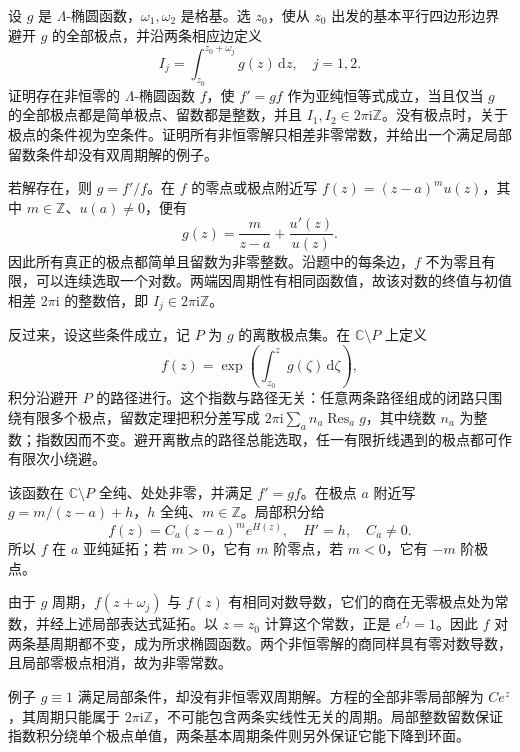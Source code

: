\begin{exercise}[一阶方程的双周期解]\label{b3:ex:22-6}
设 \(g\) 是 \(\Lambda\)-椭圆函数，\(\omega_1,\omega_2\) 是格基。选 \(z_0\)，使从 \(z_0\) 出发的基本平行四边形边界避开 \(g\) 的全部极点，并沿两条相应边定义
\[
 I_j=\int_{z_0}^{z_0+\omega_j}g(z)\,\mathrm{d}z,\quad j=1,2.
\]
证明存在非恒零的 \(\Lambda\)-椭圆函数 \(f\)，使 \(f'=gf\) 作为亚纯恒等式成立，当且仅当 \(g\) 的全部极点都是简单极点、留数都是整数，并且
\(I_1,I_2\in2\pi\mathrm{i}\mathbb Z\)。没有极点时，关于极点的条件视为空条件。证明所有非恒零解只相差非零常数，并给出一个满足局部留数条件却没有双周期解的例子。
\end{exercise}
\begin{solution}
若解存在，则 \(g=f'/f\)。在 \(f\) 的零点或极点附近写
\(f(z)=(z-a)^m u(z)\)，其中 \(m\in\mathbb Z\)、\(u(a)\ne0\)，便有
\[
 g(z)=\frac m{z-a}+\frac{u'(z)}{u(z)}.
\]
因此所有真正的极点都简单且留数为非零整数。沿题中的每条边，\(f\) 不为零且有限，可以连续选取一个对数。两端因周期性有相同函数值，故该对数的终值与初值相差 \(2\pi\mathrm{i}\) 的整数倍，即 \(I_j\in2\pi\mathrm{i}\mathbb Z\)。

反过来，设这些条件成立，记 \(P\) 为 \(g\) 的离散极点集。在 \(\mathbb C\setminus P\) 上定义
\[
 f(z)=\exp\left(\int_{z_0}^z g(\zeta)\,\mathrm{d}\zeta\right),
\]
积分沿避开 \(P\) 的路径进行。这个指数与路径无关：任意两条路径组成的闭路只围绕有限多个极点，留数定理把积分差写成
\(2\pi\mathrm{i}\sum_a n_a\operatorname{Res}_a g\)，其中绕数 \(n_a\) 为整数；指数因而不变。避开离散点的路径总能选取，任一有限折线遇到的极点都可作有限次小绕避。

该函数在 \(\mathbb C\setminus P\) 全纯、处处非零，并满足 \(f'=gf\)。在极点 \(a\) 附近写
\(g=m/(z-a)+h\)，\(h\) 全纯、\(m\in\mathbb Z\)。局部积分给
\[
 f(z)=C_a(z-a)^m e^{H(z)},\quad H'=h,\quad C_a\ne0.
\]
所以 \(f\) 在 \(a\) 亚纯延拓；若 \(m>0\)，它有 \(m\) 阶零点，若 \(m<0\)，它有 \(-m\) 阶极点。

由于 \(g\) 周期，\(f(z+\omega_j)\) 与 \(f(z)\) 有相同对数导数，它们的商在无零极点处为常数，并经上述局部表达式延拓。以 \(z=z_0\) 计算这个常数，正是 \(e^{I_j}=1\)。因此 \(f\) 对两条基周期都不变，成为所求椭圆函数。两个非恒零解的商同样具有零对数导数，且局部零极点相消，故为非零常数。

例子 \(g\equiv1\) 满足局部条件，却没有非恒零双周期解。方程的全部非零局部解为 \(Ce^z\)，其周期只能属于 \(2\pi\mathrm{i}\mathbb Z\)，不可能包含两条实线性无关的周期。局部整数留数保证指数积分绕单个极点单值，两条基本周期条件则另外保证它能下降到环面。
\end{solution}


